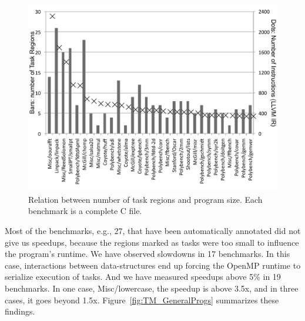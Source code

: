 \documentclass[sigplan,10pt,review,anonymous]{acmart}
\begin{document}
\begin{figure}[htb]
\begin{center}
\includegraphics[width=1\columnwidth]{images/TM_Versatility}
\caption{Relation between number of task regions and program size.
Each benchmark is a complete C file.}
\label{fig:TM_Versatility}
\end{center}
\end{figure}

Most of the benchmarks, e.g., 27, that have been automatically annotated did not
give us speedups, because the regions marked as tasks were too small to influence
the program's runtime.
We have observed slowdowns in 17 benchmarks.
In this case, interactions between data-structures end up forcing the OpenMP
runtime to serialize execution of tasks.
And we have measured speedups above 5\% in 19 benchmarks.
In one case, \textsf{Misc/lowercase}, the speedup is above 3.5x, and in
three cases, it goes beyond 1.5x.
Figure~\ref{fig:TM_GeneralProgs} summarizes these findings.
\end{document}
